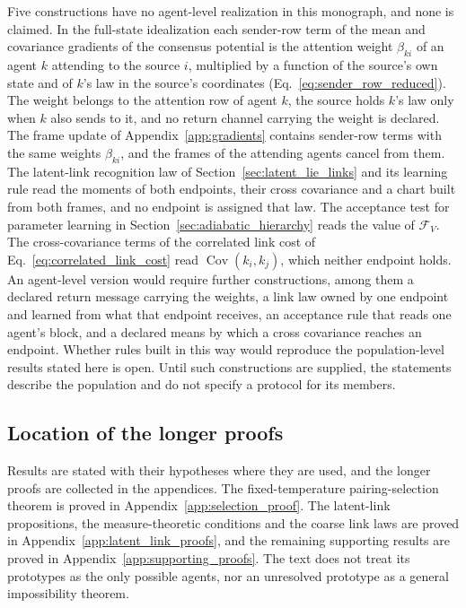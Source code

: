 Five constructions have no agent-level realization in this monograph, and none is claimed. In the full-state idealization each sender-row term of the mean and covariance gradients of the consensus potential is the attention weight $\beta_{ki}$ of an agent $k$ attending to the source $i$, multiplied by a function of the source's own state and of $k$'s law in the source's coordinates (Eq.~\eqref{eq:sender_row_reduced}). The weight belongs to the attention row of agent $k$, the source holds $k$'s law only when $k$ also sends to it, and no return channel carrying the weight is declared. The frame update of Appendix~\ref{app:gradients} contains sender-row terms with the same weights $\beta_{ki}$, and the frames of the attending agents cancel from them. The latent-link recognition law of Section~\ref{sec:latent_lie_links} and its learning rule read the moments of both endpoints, their cross covariance and a chart built from both frames, and no endpoint is assigned that law. The acceptance test for parameter learning in Section~\ref{sec:adiabatic_hierarchy} reads the value of $\mathcal F_V$. The cross-covariance terms of the correlated link cost of Eq.~\eqref{eq:correlated_link_cost} read $\operatorname{Cov}(k_i,k_j)$, which neither endpoint holds. An agent-level version would require further constructions, among them a declared return message carrying the weights, a link law owned by one endpoint and learned from what that endpoint receives, an acceptance rule that reads one agent's block, and a declared means by which a cross covariance reaches an endpoint. Whether rules built in this way would reproduce the population-level results stated here is open. Until such constructions are supplied, the statements describe the population and do not specify a protocol for its members.

\subsection{Location of the longer proofs}\label{sec:companion_theory}
Results are stated with their hypotheses where they are used, and the longer proofs are collected in the appendices. The fixed-temperature pairing-selection theorem is proved in Appendix~\ref{app:selection_proof}. The latent-link propositions, the measure-theoretic conditions and the coarse link laws are proved in Appendix~\ref{app:latent_link_proofs}, and the remaining supporting results are proved in Appendix~\ref{app:supporting_proofs}. The text does not treat its prototypes as the only possible agents, nor an unresolved prototype as a general impossibility theorem.

